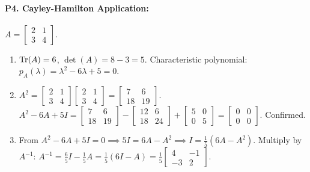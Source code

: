 \paragraph{P4. Cayley-Hamilton Application:}
$A = \begin{bmatrix} 2 & 1 \\ 3 & 4 \end{bmatrix}$.
\begin{enumerate}[label=(\alph*)]
    \item $\operatorname{Tr}(A) = 6$, $\det(A) = 8 - 3 = 5$. Characteristic polynomial: $p_A(\lambda) = \lambda^2 - 6\lambda + 5 = 0$.
    \item $A^2 = \begin{bmatrix} 2 & 1 \\ 3 & 4 \end{bmatrix} \begin{bmatrix} 2 & 1 \\ 3 & 4 \end{bmatrix} = \begin{bmatrix} 7 & 6 \\ 18 & 19 \end{bmatrix}$.
    $A^2 - 6A + 5I = \begin{bmatrix} 7 & 6 \\ 18 & 19 \end{bmatrix} - \begin{bmatrix} 12 & 6 \\ 18 & 24 \end{bmatrix} + \begin{bmatrix} 5 & 0 \\ 0 & 5 \end{bmatrix} = \begin{bmatrix} 0 & 0 \\ 0 & 0 \end{bmatrix}$. Confirmed.
    \item From $A^2 - 6A + 5I = 0 \implies 5I = 6A - A^2 \implies I = \frac{1}{5}(6A - A^2)$.
    Multiply by $A^{-1}$: $A^{-1} = \frac{6}{5}I - \frac{1}{5}A = \frac{1}{5}(6I - A) = \frac{1}{5}\begin{bmatrix} 4 & -1 \\ -3 & 2 \end{bmatrix}$.
\end{enumerate}

